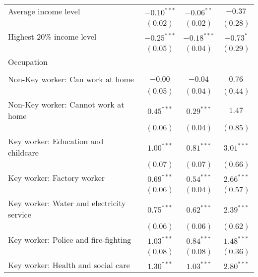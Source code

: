 \begin{table}
\begin{center}
\begin{scriptsize}
\begin{tabular}{l c c c}
\quad Average income level                      & $-0.10^{***}$ & $-0.06^{**}$  & $-0.37$       \\
                                                & $(0.02)$      & $(0.02)$      & $(0.28)$      \\
\quad Highest 20\% income level                 & $-0.25^{***}$ & $-0.18^{***}$ & $-0.73^{*}$   \\
                                                & $(0.05)$      & $(0.04)$      & $(0.29)$      \\
Occupation                                      &               &               &               \\
                                                &               &               &               \\
\quad Non-Key worker: Can work at home          & $-0.00$       & $-0.04$       & $0.76$        \\
                                                & $(0.05)$      & $(0.04)$      & $(0.44)$      \\
\quad Non-Key worker: Cannot work at home       & $0.45^{***}$  & $0.29^{***}$  & $1.47$        \\
                                                & $(0.06)$      & $(0.04)$      & $(0.85)$      \\
\quad Key worker: Education and childcare       & $1.00^{***}$  & $0.81^{***}$  & $3.01^{***}$  \\
                                                & $(0.07)$      & $(0.07)$      & $(0.66)$      \\
\quad Key worker: Factory worker                & $0.69^{***}$  & $0.54^{***}$  & $2.66^{***}$  \\
                                                & $(0.06)$      & $(0.04)$      & $(0.57)$      \\
\quad Key worker: Water and electricity service & $0.75^{***}$  & $0.62^{***}$  & $2.39^{***}$  \\
                                                & $(0.06)$      & $(0.06)$      & $(0.62)$      \\
\quad Key worker: Police and fire-fighting      & $1.03^{***}$  & $0.84^{***}$  & $1.48^{***}$  \\
                                                & $(0.08)$      & $(0.08)$      & $(0.36)$      \\
\quad Key worker: Health and social care        & $1.30^{***}$  & $1.03^{***}$  & $2.80^{***}$  \\

\end{tabular}
\end{scriptsize}
\end{center}
\end{table}
